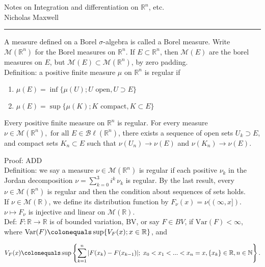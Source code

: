 \documentclass[12pt]{article}
\newcommand{\fall}[0] { \textrm{ for all } }
\newcommand{\nats}[0] { \mathbb{N}}
\newcommand{\reals}[0] { \mathbb{R}}
\newcommand{\M}[0] { \mathcal{M} }
\newcommand{\Bl}[0] { \mathcal{B} \ell }
\newcommand{\rarw}[0] { \rightarrow }
\newcommand{ \defeq }[0] { \colonequals }
\newcommand{ \Var } { \textrm{Var} }
\begin{document}
\begin{flushleft}
Notes on Integration and differentiation on $\reals^n$, etc. \\
Nicholas Maxwell\\
\end{flushleft}

\begin{flushleft}
\addvspace{5pt} \hrule
\end{flushleft}	

A measure defined on a Borel $\sigma$-algebra is called a Borel measure. Write $\M(\reals^n)$ for the Borel measures on $\reals^n$. If $E \subset \reals^n$, then $\M(E)$ are the borel measures on $E$, but $\M(E) \subset \M(\reals^n)$, by zero padding. \\

Definition: a positive finite measure $\mu$ on $\reals^n$ is regular if

\begin{enumerate}
\item
$\mu(E) = \inf \{ \mu(U) ; U \textrm{ open}, U \supset E \}$
\item
$\mu(E) = \sup \{ \mu(K) ; K \textrm{ compact}, K \subset E \}$
\end{enumerate}

Every positive finite measure on $\reals^n$ is regular. For every measure $\nu \in \M(\reals^n), \fall E \in \Bl(\reals^n)$, there exists a sequence of open sets $U_k \supset E$, and compact sets $K_n \subset E$ such that $\nu(U_n) \rarw \nu(E)$ and $\nu(K_n) \rarw \nu(E)$.

\noindent
Proof: ADD \\

Definition: we say a measure $\nu \in \M(\reals^n)$ is regular if each positive $\nu_k$ in the Jordan decomposition $\nu = \sum_{k=0}^3 i^k \, \nu_k$ is regular. By the last result, every $\nu \in \M(\reals^n)$ is regular and then the condition about sequences of sets holds. \\

If $\nu \in \M(\reals)$, we define its distribution function by $F_\nu (x) = \nu((\infty,x])$. $\nu \mapsto F_\nu$ is injective and linear on $\M(\reals)$. \\

Def: $F: \reals \rarw \reals$ is of bounded variation, BV, or say $F \in BV$, if $\Var(F) < \infty$, where $\Var(F) \defeq \sup\{ V_F(x); x \in \reals \}$, and 

$$
V_F(x) \defeq \sup \left\{  \sum_{k=1}^n |F(x_k) - F(x_{k-1})| ; \;  x_0    < x_1 < ... < x_n=x, \{ x_k \} \in \reals, n \in \nats \right\}.
$$
\end{document}
